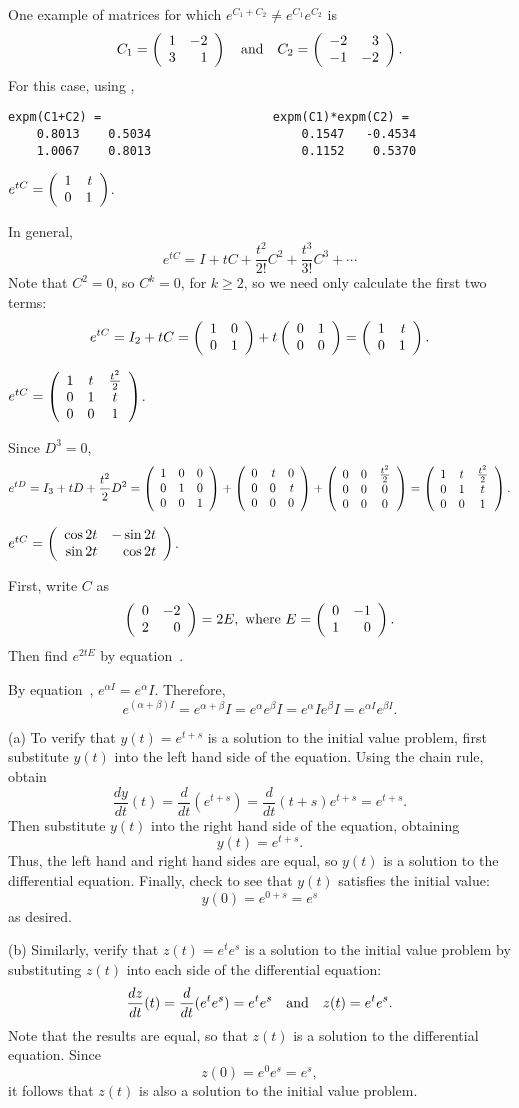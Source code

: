 One example of matrices for which $e^{C_1 + C_2} \neq e^{C_1}e^{C_2}$ is
\[ C_1 = \left(\begin{array}{rr} 1 & -2\\ 3 &1\end{array}\right) \quad\mbox{and}\quad C_2 = \left(\begin{array}{rr} -2 & 3\\ -1 &-2\end{array}\right). \]
For this case, using \Matlabp,
\begin{verbatim}
expm(C1+C2) =                        expm(C1)*expm(C2) =
    0.8013    0.5034                     0.1547   -0.4534
    1.0067    0.8013                     0.1152    0.5370
\end{verbatim}

 \ans $e^{tC} = \left(\begin{array}{rr} 1 & t\\ 0 &1\end{array}\right)$.

\soln In general,
\[
e^{tC} = I + tC + \frac{t^2}{2!}C^2 + \frac{t^3}{3!}C^3 + \cdots
\]
Note that $C^2 = 0$, so $C^k = 0$, for $k \geq 2$, so we need only
calculate the first two terms:
\[
e^{tC} = I_2 + tC = \left(\begin{array}{rr} 1 & 0\\ 0 &1\end{array}\right) + t\left(\begin{array}{rr} 0 & 1\\ 0 &0\end{array}\right) =
\left(\begin{array}{rr} 1 & t\\ 0 &1\end{array}\right).
\]

 \ans $e^{tC} =
\left(\begin{array}{ccc} 1 & t & \frac{t^2}{2} \\ 0 & 1 & t \\ 0 & 0 & 1\end{array}\right)$.

\soln Since $D^3 = 0$,
\[
e^{tD} = I_3 + tD + \frac{t^2}{2}D^2 =
\left(\begin{array}{rrr} 1 & 0 & 0 \\ 0 & 1 & 0 \\ 0 & 0 & 1\end{array}\right) +
\left(\begin{array}{rrr} 0 & t & 0 \\ 0 & 0 & t \\ 0 & 0 & 0\end{array}\right) +
\left(\begin{array}{ccc} 0 & 0 & \frac{t^2}{2} \\ 0 & 0 & 0 \\ 0 & 0 & 0\end{array}\right) =
\left(\begin{array}{ccc} 1 & t & \frac{t^2}{2} \\ 0 & 1 & t \\ 0 & 0 & 1\end{array}\right).
\]

 \ans $e^{tC} =
\left(\begin{array}{rr} \cos 2t & -\sin 2t\\ \sin 2t &\cos 2t\end{array}\right)$.

\soln 
First, write $C$ as
\[
\left(\begin{array}{rr} 0 & -2\\ 2 &0\end{array}\right) = 2E, \hbox{ where } E = \left(\begin{array}{rr} 0 & -1\\ 1 &0\end{array}\right).
\]
Then find $e^{2tE}$ by equation~.

By equation~, $e^{\alpha I} = e^\alpha I$.  Therefore,
\[ e^{(\alpha + \beta)I} = e^{\alpha + \beta}I = e^\alpha e^\beta I
= e^\alpha I e^\beta I = e^{\alpha I}e^{\beta I}. \]

(a) To verify that $y(t) = e^{t + s}$ is a solution to the initial value
problem, first substitute $y(t)$ into the left hand side of the equation.
Using the chain rule, obtain
\[
\frac{dy}{dt}(t) = \frac{d}{dt}(e^{t + s}) = \frac{d}{dt}(t + s)e^{t + s}
= e^{t + s}.
\]
Then substitute $y(t)$ into the right hand side of the equation, obtaining
\[
y(t) = e^{t + s}.
\]
Thus, the left hand and right hand sides are equal, so $y(t)$ is a
solution to the differential equation.  Finally, check to see that
$y(t)$ satisfies the initial value:
\[
y(0) = e^{0 + s} = e^s
\]
as desired.

(b) Similarly, verify that $z(t) = e^te^s$ is a solution to the initial
value problem by substituting $z(t)$ into each side of the differential
equation:
\[
\frac{dz}{dt}(t) = \frac{d}{dt}(e^te^s) = e^te^s \quad\mbox{and}\quad
z(t) = e^te^s.
\]
Note that the results are equal, so that $z(t)$ is a solution to the
differential equation.  Since
\[
z(0) = e^0e^s = e^s,
\]
it follows that $z(t)$ is also a solution to the initial value problem.

